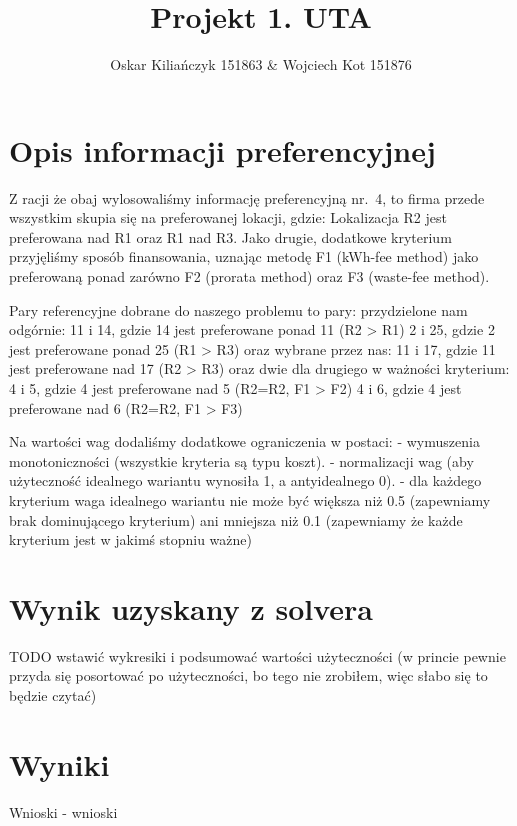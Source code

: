 \documentclass[11pt]{article}
\title{Projekt 1. UTA}
\author{Oskar Kiliańczyk 151863 \& Wojciech Kot 151876}
\date{}
\begin{document}
\maketitle
\newpage

\section{Opis informacji preferencyjnej}\label{sec:opis-informacji-preferencyjnej}

Z racji że obaj wylosowaliśmy informację preferencyjną nr.\ 4, to firma przede wszystkim skupia się na preferowanej lokacji, gdzie:
Lokalizacja R2 jest preferowana nad R1 oraz R1 nad R3.
Jako drugie, dodatkowe kryterium przyjęliśmy sposób finansowania,
uznając metodę F1 (kWh-fee method) jako preferowaną ponad zarówno F2 (prorata method) oraz F3 (waste-fee method).


Pary referencyjne dobrane do naszego problemu to pary:
    przydzielone nam odgórnie:
    11 i 14, gdzie 14 jest preferowane ponad 11 (R2 > R1)
    2 i 25, gdzie 2 jest preferowane ponad 25 (R1 > R3)
    oraz wybrane przez nas:
    11 i 17, gdzie 11 jest preferowane nad 17 (R2 > R3)
    oraz dwie dla drugiego w ważności kryterium:
    4 i 5, gdzie 4 jest preferowane nad 5 (R2=R2, F1 > F2)
    4 i 6,  gdzie 4 jest preferowane nad 6 (R2=R2, F1 > F3)

Na wartości wag dodaliśmy dodatkowe ograniczenia w postaci:
- wymuszenia monotoniczności (wszystkie kryteria są typu koszt).
- normalizacji wag (aby użyteczność idealnego wariantu wynosiła 1, a antyidealnego 0).
- dla każdego kryterium waga idealnego wariantu nie może być większa niż 0.5 (zapewniamy brak dominującego kryterium)
ani mniejsza niż 0.1 (zapewniamy że każde kryterium jest w jakimś stopniu ważne)


\section{Wynik uzyskany z solvera}\label{sec:wynik-uzyskany-z-solvera}

TODO wstawić wykresiki i podsumować wartości użyteczności
(w princie pewnie przyda się posortować po użyteczności, bo tego nie zrobiłem, więc słabo się to będzie czytać)


\section{Wyniki}\label{sec:wyniki}

Wnioski - wnioski
\end{document}
